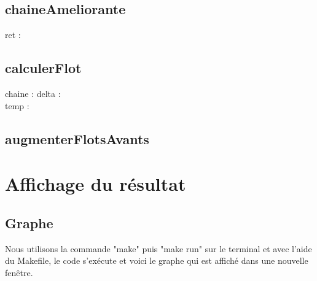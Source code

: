 \documentclass{article}
\begin{document}
\subsection{chaineAmeliorante}
\begin{algorithme}
    {
        ret :
    }
    {
        {
        }
        {
        }
    }

\end{algorithme}
\subsection{calculerFlot}
\begin{algorithme}
     {chaine : } {\reel}
    {
        delta :  \\
        temp : \reel \\
    }
    {
    }
\end{algorithme}
\subsection{augmenterFlotsAvants}

\section{Affichage du résultat}

\subsection{Graphe}

Nous utilisons la commande "make" puis "make run" sur le terminal et avec l'aide du Makefile, le code s'exécute et voici le graphe qui est affiché dans une nouvelle fenêtre.
\end{document}
